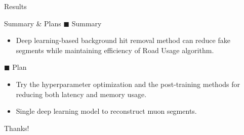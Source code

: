 \documentclass[10pt]{beamer}
\begin{document}
\begin{frame}[fragile]{Results}
\begin{itemize}
\begin{itemize}
    \end{itemize}
\end{itemize}
\end{frame}



\begin{frame}[fragile]{Summary \& Plans}
    $\blacksquare$ Summary
    \begin{itemize}
        \item Deep learning-based background hit removal method can reduce fake segments while maintaining efficiency of Road Usage algorithm.
    \end{itemize}
    
    $\blacksquare$ Plan
    \begin{itemize}
        \item Try the hyperparameter optimization and the post-training methods for reducing both latency and memory usage. 
        \item Single deep learning model to reconstruct muon segments.
    \end{itemize}
\end{frame}

{
\begin{frame}[standout]
  Thanks!
\end{frame}
}
\end{document}
